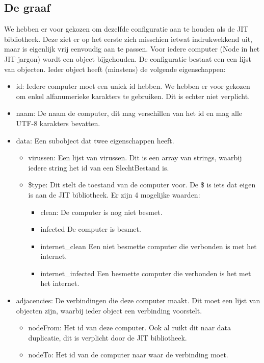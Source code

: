 \documentclass[a4paper,oneside]{report}
\begin{document}
\subsection{De graaf}
We hebben er voor gekozen om dezelfde configuratie aan te houden als de JIT bibliotheek.
Deze ziet er op het eerste zich misschien ietwat indrukwekkend uit, maar is eigenlijk vrij eenvoudig aan te passen.
Voor iedere computer (Node in het JIT-jargon) wordt een object bijgehouden. De configuratie bestaat een een lijst van objecten.
Ieder object heeft (minstens) de volgende eigenschappen:
\begin{itemize}
    \item id: Iedere computer moet een uniek id hebben. We hebben er voor gekozen om enkel alfanumerieke karakters te gebruiken. Dit is echter niet verplicht.
    \item naam: De naam de computer, dit mag verschillen van het id en mag alle UTF-8 karakters bevatten.
    \item data: Een subobject dat twee eigenschappen heeft.
    	\begin{itemize}
	    \item virussen: Een lijst van virussen. Dit is een array van strings, waarbij iedere string het id van een SlechtBestand is.
	    \item \$type: Dit stelt de toestand van de computer voor. De \$ is iets dat eigen is aan de JIT bibliotheek. 
	    		Er zijn 4 mogelijke waarden: 
			\begin{itemize}
			    \item clean: De computer is nog niet besmet.
			    \item infected De computer is besmet.
			    \item internet\_clean Een niet besmette computer die verbonden is met het internet.
			    \item internet\_infected Een besmette computer die verbonden is het met het internet.
			\end{itemize}
	\end{itemize}
    \item adjacencies: De verbindingen die deze computer maakt. Dit moet een lijst van objecten zijn, waarbij ieder object een verbinding voorstelt.
    	\begin{itemize}
	    \item nodeFrom: Het id van deze computer. Ook al ruikt dit naar data duplicatie, dit is verplicht door de JIT bibliotheek.
	    \item nodeTo: Het id van de computer naar waar de verbinding moet.
	\end{itemize}
\end{itemize}
\pagebreak
\end{document}
